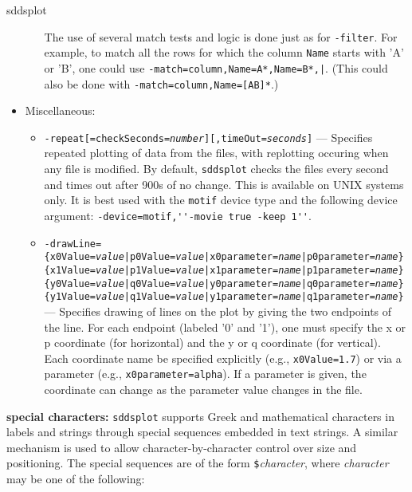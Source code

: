 \begin{sddsprog}{sddsplot}
\begin{itemize}
\begin{itemize}
The use of several match tests and logic is done just as for {\tt -filter}.  For example, to match
all the rows for which the column {\tt Name} starts with 'A' or 'B', one could use
{\tt -match=column,Name=A*,Name=B*,|}.  (This could also be done with {\tt -match=column,Name=[AB]*}.)
  \end{itemize}
\item {Miscellaneous:}
\begin{itemize}
        \item {\tt -repeat[=checkSeconds={\em number}][,timeOut={\em seconds}]} ---
Specifies repeated plotting of data from the files, with replotting occuring when any
file is modified.  By default, \verb|sddsplot| checks the files every second and times out
after 900s of no change.  This is available on UNIX systems only.  It is best used with
the \verb|motif| device type and the following device argument:
\verb|-device=motif,''-movie true -keep 1''|.
        \item {\tt -drawLine=}
        {\tt \{x0Value={\em value}|p0Value={\em value}|x0parameter={\em name}|p0parameter={\em name}\}}
        {\tt \{x1Value={\em value}|p1Value={\em value}|x1parameter={\em name}|p1parameter={\em name}\}}
        {\tt \{y0Value={\em value}|q0Value={\em value}|y0parameter={\em name}|q0parameter={\em name}\}}
        {\tt \{y1Value={\em value}|q1Value={\em value}|y1parameter={\em name}|q1parameter={\em name}\}} ---
        Specifies drawing of lines on the plot by giving the two endpoints of the line.
        For each endpoint (labeled '0' and '1'), one must specify the x or p coordinate (for horizontal) and
        the y or q coordinate (for vertical).  Each coordinate name be specified explicitly (e.g.,
        \verb|x0Value=1.7|) or via a parameter (e.g., \verb|x0parameter=alpha|).  If a parameter is
        given, the coordinate can change as the parameter value changes in the file.
        
\end{itemize}

\end{itemize}

  \item \textbf{special characters:}
\verb|sddsplot| supports Greek and mathematical characters in labels and strings through special sequences embedded in
text strings.  A similar mechanism is used to allow character-by-character control over size and positioning.
The special sequences are of the form \verb|$|{\em character}, where {\em character} may be one of the following:
\begin{itemize}


\end{itemize}
\end{sddsprog}
